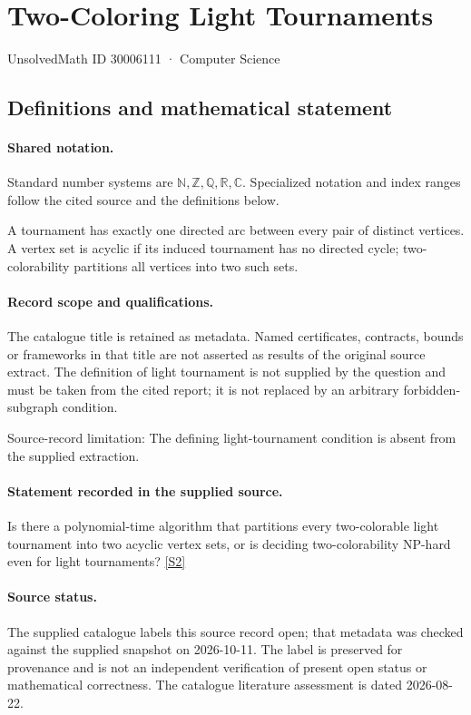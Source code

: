 \documentclass[11pt]{article}
\newcommand{\sref}[2]{\hyperlink{source:#1:#2}{[S#2]}}
\begin{document}
\setcounter{section}{30006110}
\section{Two-Coloring Light Tournaments}\label{30006111}
{\small\sffamily UnsolvedMath ID 30006111 · Computer Science}
\subsection{Definitions and mathematical statement}

\paragraph{Shared notation.}Standard number systems are $\mathbb N,\mathbb Z,\mathbb Q,\mathbb R,\mathbb C$. Specialized notation and index ranges follow the cited source and the definitions below.


A tournament has exactly one directed arc between every pair of distinct vertices. A vertex set is acyclic if its induced tournament has no directed cycle; two-colorability partitions all vertices into two such sets.
\paragraph{Record scope and qualifications.}
The catalogue title is retained as metadata. Named certificates, contracts, bounds or frameworks in that title are not asserted as results of the original source extract.
The definition of light tournament is not supplied by the question and must be taken from the cited report; it is not replaced by an arbitrary forbidden-subgraph condition.

Source-record limitation: The defining light-tournament condition is absent from the supplied extraction.
\paragraph{Statement recorded in the supplied source.}
Is there a polynomial-time algorithm that partitions every two-colorable light tournament into two acyclic vertex sets, or is deciding two-colorability NP-hard even for light tournaments? \sref{30006111}{2}
\paragraph{Source status.}
The supplied catalogue labels this source record open; that metadata was checked against the supplied snapshot on 2026-10-11. The label is preserved for provenance and is not an independent verification of present open status or mathematical correctness. The catalogue literature assessment is dated 2026-08-22.
\end{document}
